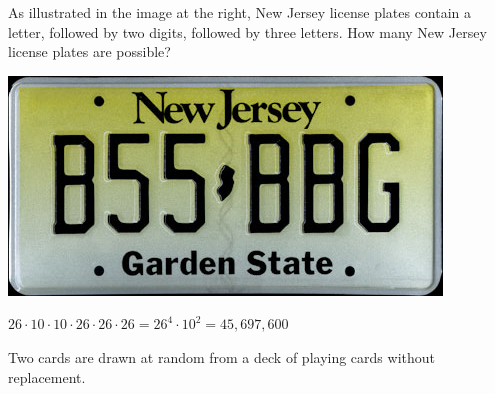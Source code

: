 \documentclass[addpoints,12pt]{exam}
\begin{document}
\begin{questions}

\begin{multicols}{2}
\question[10]
As illustrated in the image at the right,
New Jersey license plates contain a letter,
followed by two digits, followed by three letters.
How many New Jersey license plates are possible?\\
\columnbreak
\begin{center}\includegraphics[scale=.3]{NewJersy}
\end{center}
\end{multicols}
\begin{solution}{\vfill}
$26\cdot 10\cdot 10\cdot 26\cdot 26\cdot 26=26^4\cdot 10^2
=45,697,600$
\end{solution}
\newpage

\question[16] Two cards are drawn at random from a deck of playing cards
without replacement.


\end{questions}
\end{document}
